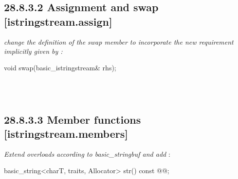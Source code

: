 \documentclass[ebook,11pt,article]{memoir}
\begin{document}
\subsection{28.8.3.2 Assignment and swap [istringstream.assign]}
\textit{change the definition of the swap member to incorporate the new requirement implicitly given by :}

%
\begin{itemdecl}
void swap(basic_istringstream& rhs);
\end{itemdecl}

\begin{itemdescr}
\pnum
\effects {}
\\
\added{\tcode{;}}\\
\added{\tcode{;}}
\end{itemdescr}


\subsection{28.8.3.3 Member functions [istringstream.members]}
\textit{Extend  overloads according to basic_stringbuf and add }:

%
\begin{itemdecl}
basic_string<charT, traits, Allocator> str() const @\added{\&}@;
\end{itemdecl}

\begin{itemdescr}
\pnum
\removed{\returns}
\added{\tcode{;}}
\end{itemdescr}
\end{document}
